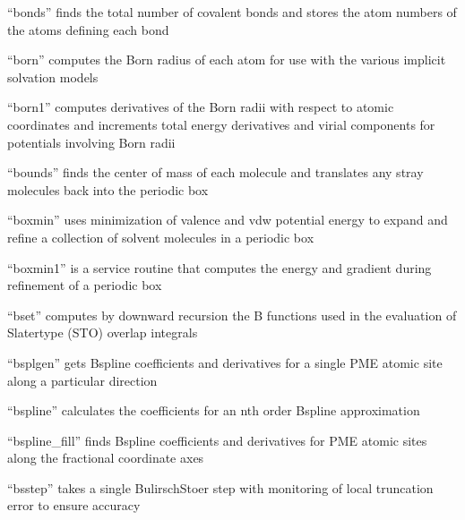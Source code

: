 \documentclass[letterpaper,11pt,english]{sphinxmanual}
\begin{document}

“bonds” finds the total number of covalent bonds and
stores the atom numbers of the atoms defining each bond


“born” computes the Born radius of each atom for use with
the various implicit solvation models


“born1” computes derivatives of the Born radii with respect
to atomic coordinates and increments total energy derivatives
and virial components for potentials involving Born radii


“bounds” finds the center of mass of each molecule and
translates any stray molecules back into the periodic box


“boxmin” uses minimization of valence and vdw potential energy
to expand and refine a collection of solvent molecules in a
periodic box


“boxmin1” is a service routine that computes the energy and
gradient during refinement of a periodic box


“bset” computes by downward recursion the B functions used
in the evaluation of Slater\sphinxhyphen{}type (STO) overlap integrals


“bsplgen” gets B\sphinxhyphen{}spline coefficients and derivatives for
a single PME atomic site along a particular direction


“bspline” calculates the coefficients for an n\sphinxhyphen{}th order
B\sphinxhyphen{}spline approximation


“bspline\_fill” finds B\sphinxhyphen{}spline coefficients and derivatives
for PME atomic sites along the fractional coordinate axes


“bsstep” takes a single Bulirsch\sphinxhyphen{}Stoer step with monitoring
of local truncation error to ensure accuracy
\end{document}
